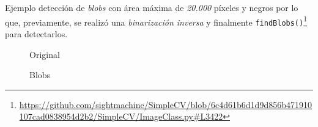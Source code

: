 Ejemplo detección de \emph{blobs} con área máxima de \emph{20.000} píxeles
y negros por lo que, previamente, se realizó una \emph{binarización
  inversa} y finalmente
\texttt{findBlobs()}\footnote{\url{https://github.com/sightmachine/SimpleCV/blob/6c4d61b6d1d9d856b471910107cad0838954d2b2/SimpleCV/ImageClass.py\#L3422}}
para detectarlos.

\begin{figure}[H]
  \caption{Original}
  \centering \setlength\fboxsep{0pt} \setlength\fboxrule{0.5pt}
\end{figure}

\begin{figure}[H]
  \centering \setlength\fboxsep{0pt} \setlength\fboxrule{0.5pt}
  \caption{Blobs}
\end{figure}